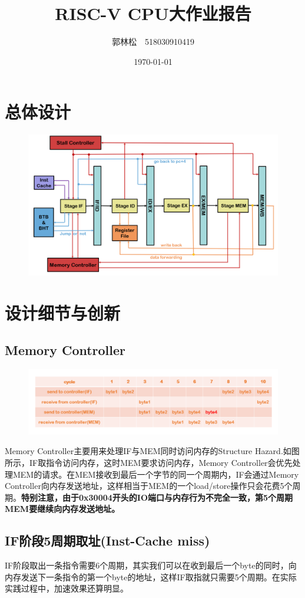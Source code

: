 \documentclass[a4paper,UTF8]{article}
\title{RISC-V CPU大作业报告}  %
\author{郭林松~~518030910419}   %
\date{\today}       %
\begin{document}
\maketitle
\section{总体设计}
\begin{figure}[h]
    \centering
	\includegraphics[width=1\linewidth]{1.png}
\end{figure}

\section{设计细节与创新}
\subsection{Memory Controller}
\begin{figure}[h]
    \centering
	\includegraphics[width=1\linewidth]{3.png}
\end{figure}
Memory Controller主要用来处理IF与MEM同时访问内存的Structure Hazard.如图所示，IF取指令访问内存，这时MEM要求访问内存，Memory Controller会优先处理MEM的请求。在MEM接收到最后一个字节的同一个周期内，IF会通过Memory Controller向内存发送地址，这样相当于MEM的一个load/store操作只会花费5个周期。\textbf{特别注意，由于0x30004开头的IO端口与内存行为不完全一致，第5个周期MEM要继续向内存发送地址。}
\subsection{IF阶段5周期取址(Inst-Cache miss)}
IF阶段取出一条指令需要6个周期，其实我们可以在收到最后一个byte的同时，向内存发送下一条指令的第一个byte的地址，这样IF取指就只需要5个周期。在实际实践过程中，加速效果还算明显。
\end{document}
